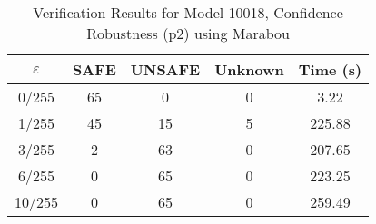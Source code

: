 \begin{table}[htbp]
\centering
\caption{Verification Results for Model 10018, Confidence Robustness (p2) using Marabou}
\label{tab:model10018_p2_marabou}
\begin{tabular}{|c|c|c|c|c|}
\hline
$\varepsilon$ & SAFE & UNSAFE & Unknown & Time (s) \\ \hline
0/255 & 65 & 0 & 0 & 3.22 \\ \hline
1/255 & 45 & 15 & 5 & 225.88 \\ \hline
3/255 & 2 & 63 & 0 & 207.65 \\ \hline
6/255 & 0 & 65 & 0 & 223.25 \\ \hline
10/255 & 0 & 65 & 0 & 259.49 \\ \hline
\end{tabular}
\end{table}
